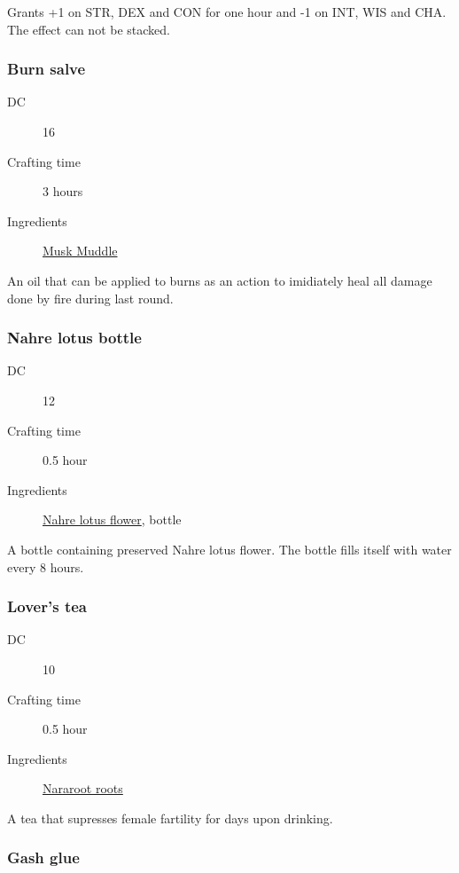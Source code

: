 Grants +1 on STR, DEX and CON for one hour and -1 on INT, WIS and CHA. The effect can not be stacked.

\subsubsection{Burn salve}
\label{Burn salve}

\begin{description}
\item [DC] 16
\item [Crafting time] 3 hours
\item [Ingredients] \hyperref[Musk Muddle]{Musk Muddle}
\end{description}

An oil that can be applied to burns as an action to imidiately heal all damage done by fire 
during last round.

\subsubsection{Nahre lotus bottle}
\label{Nahre lotus bottle}

\begin{description}
\item [DC] 12
\item [Crafting time] 0.5 hour
\item [Ingredients] \hyperref[Nahre Lotus]{Nahre lotus flower}, bottle
\end{description}

A bottle containing preserved Nahre lotus flower. The bottle fills itself with water every 8 hours.

\subsubsection{Lover's tea}
\label{Lover's tea}

\begin{description}
\item [DC] 10
\item [Crafting time] 0.5 hour
\item [Ingredients] \hyperref[Nararoot]{Nararoot roots}
\end{description}

A tea that supresses female fartility for  days upon drinking.

\subsubsection{Gash glue}
\label{Gash glue}


